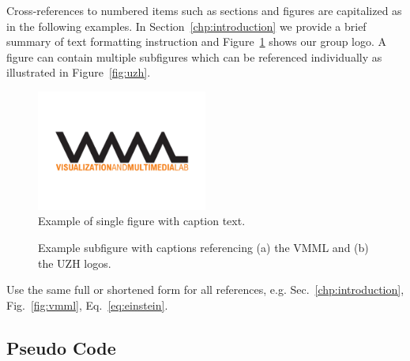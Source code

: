 \documentclass[11pt, a4paper,oneside,chapterprefix=false]{scrbook}
\begin{document}
Cross-references to numbered items such as sections and figures are capitalized as in the following examples. In Section~\ref{chp:introduction} we provide a brief summary of text formatting instruction and Figure~\ref{fig:logo} shows our group logo. A figure can contain multiple subfigures which can be referenced individually as illustrated in Figure~\ref{fig:uzh}.

\begin{figure}[htp]
 \centering
 \includegraphics[width=0.5\textwidth]{figures/vmml_logo}
 \caption{Example of single figure with caption text.}
 \label{fig:logo}
\end{figure}

\begin{figure}[htp]
 \centering
{} \hfill
{}
 \caption{Example subfigure with captions referencing (a) the VMML and (b) the UZH logos.}
\end{figure}

Use the same full or shortened form for all references, e.g. Sec.~\ref{chp:introduction}, Fig.~\ref{fig:vmml}, Eq.~\ref{eq:einstein}.

\subsection*{Pseudo Code}
\end{document}
